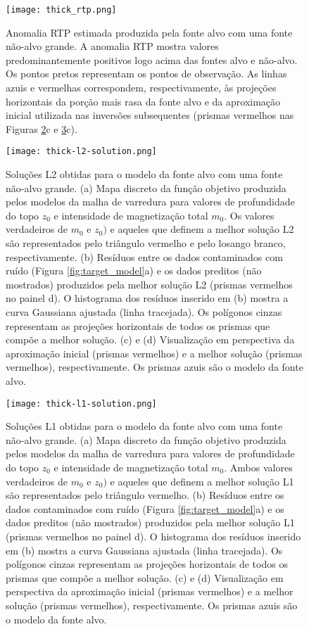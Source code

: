 \begin{figure}[!htb]
	\centering
	\texttt{[image: thick\_rtp.png]}
	\caption{Anomalia RTP estimada produzida pela fonte alvo com uma fonte não-alvo grande. 
		A anomalia RTP mostra valores predominantemente positivos logo acima das fontes alvo e não-alvo. Os pontos pretos representam os pontos de observação. As linhas azuis e vermelhas correspondem, respectivamente, às projeções horizontais da porção mais rasa da fonte alvo e da aproximação inicial utilizada nas inversões subsequentes (prismas vermelhos nas Figuras \ref{fig:thick_l2_result}c e 
		\ref{fig:thick_l1_result}c).
	}
	\label{fig:thick_model_rtp}
\end{figure}
\pagebreak
\begin{figure}[!htb]
	\centering
	\texttt{[image: thick-l2-solution.png]}
	\caption{Soluções L2 obtidas para o modelo da fonte alvo com uma fonte não-alvo grande. 
	(a) Mapa discreto da função objetivo produzida pelos modelos da malha de varredura para valores de profundidade do topo $z_{0}$ e intensidade de magnetização total $m_{0}$. 
	Os valores verdadeiros de $m_{0}$ e $z_{0})$ e aqueles que definem a melhor solução L2 são representados pelo triângulo vermelho e pelo losango branco, respectivamente.
	(b) Resíduos entre os dados contaminados com ruído (Figura \ref{fig:target_model}a) 
	e os dados preditos (não mostrados) produzidos pela melhor solução L2 (prismas vermelhos no painel d). 
	O histograma dos resíduos inserido em (b) mostra a curva Gaussiana ajustada (linha tracejada).
	Os polígonos cinzas representam as projeções horizontais de todos os prismas que compõe a melhor solução. 
	(c) e (d) Visualização em perspectiva da aproximação inicial (prismas vermelhos) e 
	a melhor solução (prismas vermelhos), respectivamente. Os prismas azuis são o modelo da fonte alvo. 
	}
	\label{fig:thick_l2_result}
\end{figure}
\pagebreak
\begin{figure}[!htb]
	\centering
	\texttt{[image: thick-l1-solution.png]}
	\caption{Soluções L1 obtidas para o modelo da fonte alvo com uma fonte não-alvo grande. 
		(a) Mapa discreto da função objetivo produzida pelos modelos da malha de varredura para valores de profundidade do topo $z_{0}$ e intensidade de magnetização total $m_{0}$. 
		Ambos valores verdadeiros de $m_{0}$ e $z_{0})$ e aqueles que definem a melhor solução L1 são representados pelo triângulo vermelho.
		(b) Resíduos entre os dados contaminados com ruído (Figura \ref{fig:target_model}a) 
		e os dados preditos (não mostrados) produzidos pela melhor solução L1 (prismas vermelhos no painel d). 
		O histograma dos resíduos inserido em (b) mostra a curva Gaussiana ajustada (linha tracejada).
		Os polígonos cinzas representam as projeções horizontais de todos os prismas que compõe a melhor solução. 
		(c) e (d) Visualização em perspectiva da aproximação inicial (prismas vermelhos) e 
		a melhor solução (prismas vermelhos), respectivamente. Os prismas azuis são o modelo da fonte alvo. 
	}
	\label{fig:thick_l1_result}
\end{figure}
\pagebreak